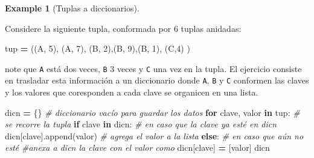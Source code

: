 \documentclass[
]{book}
\newenvironment{Shaded}{\begin{snugshade}}{\end{snugshade}}
\newcommand{\CommentTok}[1]{\textcolor[rgb]{0.56,0.35,0.01}{\textit{#1}}}
\newcommand{\ControlFlowTok}[1]{\textcolor[rgb]{0.13,0.29,0.53}{\textbf{#1}}}
\newcommand{\DecValTok}[1]{\textcolor[rgb]{0.00,0.00,0.81}{#1}}
\newcommand{\KeywordTok}[1]{\textcolor[rgb]{0.13,0.29,0.53}{\textbf{#1}}}
\newcommand{\NormalTok}[1]{#1}
\newcommand{\OperatorTok}[1]{\textcolor[rgb]{0.81,0.36,0.00}{\textbf{#1}}}
\newcommand{\StringTok}[1]{\textcolor[rgb]{0.31,0.60,0.02}{#1}}
\theoremstyle{definition}
\theoremstyle{definition}
\newtheorem{example}{Example}[chapter]
\theoremstyle{definition}
\theoremstyle{definition}
\theoremstyle{remark}
\begin{document}
\begin{example}[Tuplas a diccionarios]
\protect\hypertarget{exm:ejemploTuplasADict}{}\label{exm:ejemploTuplasADict}

Considere la siguiente tupla, conformada por 6 tuplas anidadas:

\begin{Shaded}
\begin{Highlighting}[]
\NormalTok{tup }\OperatorTok{=}\NormalTok{ ((}\StringTok{\textquotesingle{}A\textquotesingle{}}\NormalTok{, }\DecValTok{5}\NormalTok{), (}\StringTok{\textquotesingle{}A\textquotesingle{}}\NormalTok{, }\DecValTok{7}\NormalTok{),}
\NormalTok{       (}\StringTok{\textquotesingle{}B\textquotesingle{}}\NormalTok{, }\DecValTok{2}\NormalTok{),(}\StringTok{\textquotesingle{}B\textquotesingle{}}\NormalTok{, }\DecValTok{9}\NormalTok{),(}\StringTok{\textquotesingle{}B\textquotesingle{}}\NormalTok{, }\DecValTok{1}\NormalTok{),}
\NormalTok{       (}\StringTok{\textquotesingle{}C\textquotesingle{}}\NormalTok{,}\DecValTok{4}\NormalTok{) )}
\end{Highlighting}
\end{Shaded}

note que \texttt{\textquotesingle{}A\textquotesingle{}} está dos veces, \texttt{\textquotesingle{}B\textquotesingle{}} 3 veces y \texttt{\textquotesingle{}C\textquotesingle{}} una vez en la tupla. El ejercicio consiste en trasladar esta información a un diccionario donde \texttt{\textquotesingle{}A\textquotesingle{}}, \texttt{\textquotesingle{}B\textquotesingle{}} y \texttt{\textquotesingle{}C\textquotesingle{}} conformen las claves y los valores que coresponden a cada clave se organicen en una lista.

\begin{Shaded}
\begin{Highlighting}[]
\NormalTok{dicn }\OperatorTok{=}\NormalTok{ \{\} }\CommentTok{\# diccionario vacío para guardar los datos  }
\ControlFlowTok{for}\NormalTok{ clave, valor }\KeywordTok{in}\NormalTok{ tup: }\CommentTok{\# se recorre la tupla }
    \ControlFlowTok{if}\NormalTok{ clave }\KeywordTok{in}\NormalTok{ dicn: }\CommentTok{\# en caso que la clave ya esté en dicn }
\NormalTok{        dicn[clave].append(valor) }\CommentTok{\# agrega el valor a la lista }
    \ControlFlowTok{else}\NormalTok{: }\CommentTok{\# en caso que aún no esté }
    \CommentTok{\#anexa a dicn la clave con el valor como }
\NormalTok{        dicn[clave] }\OperatorTok{=}\NormalTok{ [valor]   }
\NormalTok{dicn }
\end{Highlighting}
\end{Shaded}


\end{example}
\end{document}
